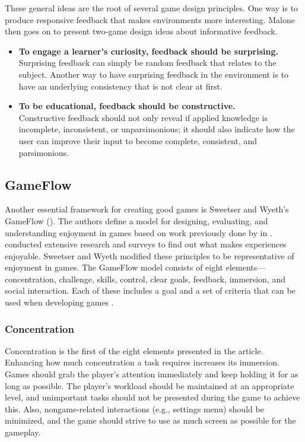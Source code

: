 \documentclass[../Main.tex]{subfiles}
\begin{document}
These general ideas are the root of several game design principles. One way is to produce responsive feedback that makes environments more interesting. Malone then goes on to present two-game design ideas about informative feedback.

\begin{itemize}
    \item \textbf{To engage a learner’s curiosity, feedback should be surprising.} \\
    Surprising feedback can simply be random feedback that relates to the subject. Another way to have surprising feedback in the environment is to have an underlying consistency that is not clear at first. 
    \item \textbf{To be educational, feedback should be constructive.} \\
    Constructive feedback should not only reveal if applied knowledge is incomplete, inconsistent, or unparsimonious; it should also indicate how the user can improve their input to become complete, consistent, and parsimonious.
\end{itemize}

\subsection{GameFlow}
Another essential framework for creating good games is Sweetser and Wyeth’s GameFlow (\citeyear{sweetser_gameflow_2005}). The authors define a model for designing, evaluating, and understanding enjoyment in games based on work previously done by \citeauthor{csikszentmihalyi_flow_1990} in \citeyear{csikszentmihalyi_flow_1990}. \citeauthor{csikszentmihalyi_flow_1990} conducted extensive research and surveys to find out what makes experiences enjoyable. Sweetser and Wyeth modified these principles to be representative of enjoyment in games. The GameFlow model consists of eight elements—concentration, challenge, skills, control, clear goals, feedback, immersion, and social interaction. Each of these includes a goal and a set of criteria that can be used when developing games \citep{sweetser_gameflow_2005}.

\subsubsection{Concentration}
Concentration is the first of the eight elements presented in the article. Enhancing how much concentration a task requires increases its immersion. Games should grab the player’s attention immediately and keep holding it for as long as possible. The player’s workload should be maintained at an appropriate level, and unimportant tasks should not be presented during the game to achieve this. Also, nongame-related interactions (e.g., settings menu) should be minimized, and the game should strive to use as much screen as possible for the gameplay. 
\end{document}
